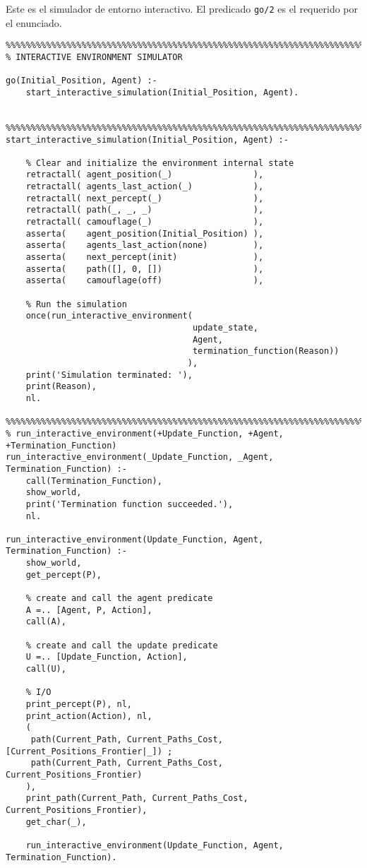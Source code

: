 \documentclass[a4paper,12pt]{report}
\begin{document}
Este es el simulador de entorno interactivo.
El predicado \texttt{go/2} es el requerido por el enunciado.

\begin{verbatim}
%%%%%%%%%%%%%%%%%%%%%%%%%%%%%%%%%%%%%%%%%%%%%%%%%%%%%%%%%%%%%%%%%%%%%%%%%%%%%%%%
% INTERACTIVE ENVIRONMENT SIMULATOR

go(Initial_Position, Agent) :-
    start_interactive_simulation(Initial_Position, Agent).


%%%%%%%%%%%%%%%%%%%%%%%%%%%%%%%%%%%%%%%%%%%%%%%%%%%%%%%%%%%%%%%%%%%%%%%%%%%%%%%%
start_interactive_simulation(Initial_Position, Agent) :-

    % Clear and initialize the environment internal state
    retractall( agent_position(_)                ),
    retractall( agents_last_action(_)            ),
    retractall( next_percept(_)                  ),
    retractall( path(_, _, _)                    ),
    retractall( camouflage(_)                    ),
    asserta(    agent_position(Initial_Position) ),
    asserta(    agents_last_action(none)         ),
    asserta(    next_percept(init)               ),
    asserta(    path([], 0, [])                  ),
    asserta(    camouflage(off)                  ),

    % Run the simulation
    once(run_interactive_environment(
                                     update_state,
                                     Agent,
                                     termination_function(Reason))
                                    ),
    print('Simulation terminated: '),
    print(Reason),
    nl.

%%%%%%%%%%%%%%%%%%%%%%%%%%%%%%%%%%%%%%%%%%%%%%%%%%%%%%%%%%%%%%%%%%%%%%%%%%%%%%%%
% run_interactive_environment(+Update_Function, +Agent, +Termination_Function)
run_interactive_environment(_Update_Function, _Agent, Termination_Function) :-
    call(Termination_Function),
    show_world,
    print('Termination function succeeded.'),
    nl.

run_interactive_environment(Update_Function, Agent, Termination_Function) :-
    show_world,
    get_percept(P),

    % create and call the agent predicate
    A =.. [Agent, P, Action],
    call(A),

    % create and call the update predicate
    U =.. [Update_Function, Action],
    call(U),

    % I/O
    print_percept(P), nl,
    print_action(Action), nl,
    (
     path(Current_Path, Current_Paths_Cost, [Current_Positions_Frontier|_]) ;
     path(Current_Path, Current_Paths_Cost, Current_Positions_Frontier)
    ),
    print_path(Current_Path, Current_Paths_Cost, Current_Positions_Frontier),
    get_char(_),

    run_interactive_environment(Update_Function, Agent, Termination_Function).

\end{verbatim}
\end{document}
